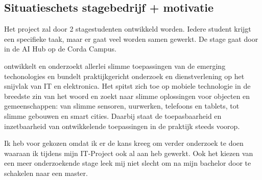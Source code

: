 \documentclass[a4paper]{article}
\begin{document}
    \subsection{Situatieschets stagebedrijf + motivatie}
      Het project zal door 2 stagestudenten ontwikkeld worden. Iedere student krijgt
      een specifieke taak, maar er gaat veel worden samen gewerkt. De stage
      gaat door in de AI Hub op de Corda Campus.\par
      \stagebedrijf{} ontwikkelt en onderzoekt allerlei slimme toepassingen van de
      emerging techonologies en bundelt praktijkgericht onderzoek en dienstverlening
      op het snijvlak van IT en elektronica. Het spitst zich toe op mobiele technologie
      in de breedste zin van het woord en zoekt naar slimme oplossingen voor
      objecten en gemeenschappen: van slimme sensoren, uurwerken, telefoons en tablets,
      tot slimme gebouwen en smart cities. Daarbij staat de toepasbaarheid en
      inzetbaarheid van ontwikkelende toepassingen in de praktijk steeds voorop.\par
      Ik heb voor \stagebedrijf{} gekozen omdat ik er de kans kreeg om verder onderzoek
      te doen waaraan ik tijdens mijn IT-Project ook al aan heb gewerkt. Ook het kiezen
      van een meer onderzoekende stage leek mij niet slecht om na mijn bachelor door te
      schakelen naar een master.

      \newpage
\end{document}
